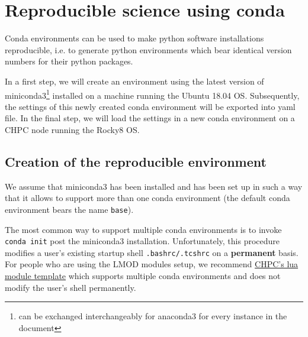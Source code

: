 \documentclass[10pt]{article}
\begin{document}
\title{}
\author{Wim R.M. Cardoen \\ Email: \$(prefix)[at]gmail[dot]com \\ where \\ prefix='wcardoen' }
\date{\today}
\maketitle
\thispagestyle{empty}
\pagestyle{plain}
\setcounter{page}{1}
\renewcommand \thesection{\Roman{section}} 

\section{Reproducible science using conda}
Conda environments can be used to make python software installations reproducible, i.e. to generate 
python environments which bear identical version numbers for their python packages. 

In a first step, we will create an environment using the latest version of miniconda3\footnote{can be exchanged interchangeably for anaconda3 for every
instance in the document} 
installed on a machine running the Ubuntu 18.04 OS. Subsequently, the settings of this newly created conda environment will be exported into yaml file.
In the final step, we will load the settings in a new conda environment on a CHPC node running the Rocky8 OS.

\subsection{Creation of the reproducible environment} 

We assume that miniconda3 has been installed and has been
set up in such a way that it allows to support more than one conda environment (the default conda environment 
bears the name \texttt{base}).

The most common way to support multiple conda environments is to invoke \lstinline[language=bash]{conda init} post the miniconda3 installation.
Unfortunately, this procedure modifies a user's existing startup shell \lstinline[language=bash]{.bashrc/.tcshrc} on a \textbf{permanent} basis.
For people who are using the LMOD modules setup, we recommend \href{https://github.com/CHPC-UofU/anaconda-modules/blob/master/miniconda3/latest.lua}{CHPC's lua module template} which supports multiple conda environments and 
does not modify the user's shell permanently. 
\end{document}
